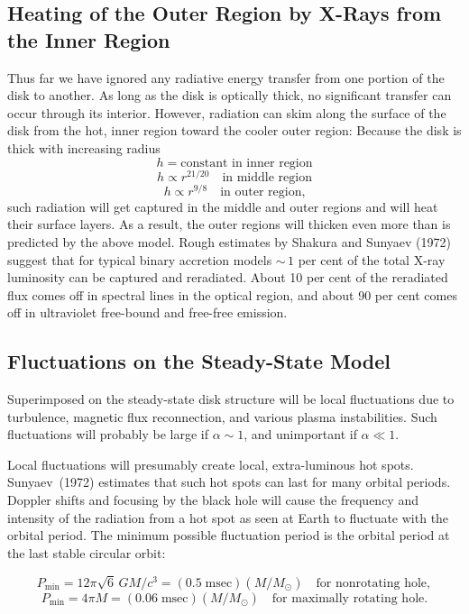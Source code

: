 \subsection{Heating of the Outer Region by X-Rays from the Inner Region}
\label{sec:5.11}

Thus far we have ignored any radiative energy transfer from one portion of the
disk to another.  As long as the disk is optically thick, no significant transfer can
occur through its interior.  However, radiation can skim along the surface of the
disk from the hot, inner region toward the cooler outer region:  Because the disk
is thick with increasing radius
%
\[
h = \text{constant in inner region}
\]
\[
h \propto r^{21/20} \quad \text{in middle region}
\]
\[
h \propto r^{9/8} \quad \text{in outer region,}
\]
%
such radiation will get captured in the middle and outer regions and will heat
their surface layers.  As a result, the outer regions will thicken even more than is
predicted by the above model.  Rough estimates by Shakura and Sunyaev (1972)
suggest that for typical binary accretion models ${\sim}\,1$ per cent of the total X-ray
luminosity can be captured and reradiated.  About 10 per cent of the reradiated
flux comes off in spectral lines in the optical region, and about 90 per cent comes
off in ultraviolet free-bound and free-free emission.

\subsection{Fluctuations on the Steady-State Model}
\label{sec:5.12}

Superimposed on the steady-state disk structure will be local fluctuations due to
turbulence, magnetic flux reconnection, and various plasma instabilities. Such
fluctuations will probably be large if $\alpha \sim 1$, and unimportant if $\alpha \ll 1$.

Local fluctuations will presumably create local, extra-luminous hot spots.
Sunyaev~(1972) \cite{Sunyaev1972} estimates that such hot spots can last for many orbital periods.
Doppler shifts and focusing by the black hole will cause the frequency and
intensity of the radiation from a hot spot as seen at Earth to fluctuate with the
orbital period. The minimum possible fluctuation period is the orbital period at
the last stable circular orbit:

\[
P_{\min} = 12\pi \sqrt{6}\, GM/c^3 = (0.5 \;\text{msec})(M/M_\odot)
\quad \text{for nonrotating hole},
\]
\[
P_{\min} = 4\pi M = (0.06 \;\text{msec})(M/M_\odot)
\quad \text{for maximally rotating hole}.
\]


